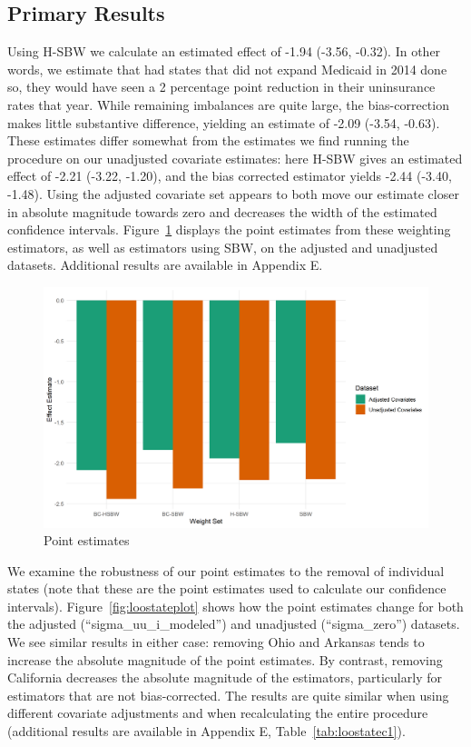 \documentclass[aoas]{imsart}
\theoremstyle{plain}
\theoremstyle{remark}
\begin{document}
\subsection{Primary Results}

Using H-SBW we calculate an estimated effect of -1.94 (-3.56, -0.32). In other words, we estimate that had states that did not expand Medicaid in 2014 done so, they would have seen a 2 percentage point reduction in their uninsurance rates that year. While remaining imbalances are quite large, the bias-correction makes little substantive difference, yielding an estimate of -2.09 (-3.54, -0.63). These estimates differ somewhat from the estimates we find running the procedure on our unadjusted covariate estimates: here H-SBW gives an estimated effect of -2.21 (-3.22, -1.20), and the bias corrected estimator yields -2.44 (-3.40, -1.48). Using the adjusted covariate set appears to both move our estimate closer in absolute magnitude towards zero and decreases the width of the estimated confidence intervals. Figure~\ref{fig:estimators} displays the point estimates from these weighting estimators, as well as estimators using SBW, on the adjusted and unadjusted datasets. Additional results are available in Appendix E.

\begin{figure}
\begin{center}
    \caption{Point estimates}
    \label{fig:estimators}
    \includegraphics[scale=0.6]{01_Plots/point-estimates-c1.png}
\end{center}
\end{figure}

We examine the robustness of our point estimates to the removal of individual states (note that these are the point estimates used to calculate our confidence intervals). Figure~\ref{fig:loostateplot} shows how the point estimates change for both the adjusted (``sigma\_uu\_i\_modeled'') and unadjusted (``sigma\_zero'') datasets. We see similar results in either case: removing Ohio and Arkansas tends to increase the absolute magnitude of the point estimates. By contrast, removing California decreases the absolute magnitude of the estimators, particularly for estimators that are not bias-corrected. The results are quite similar when using different covariate adjustments and when recalculating the entire procedure (additional results are available in Appendix E, Table~\ref{tab:loostatec1}). 
\end{document}
